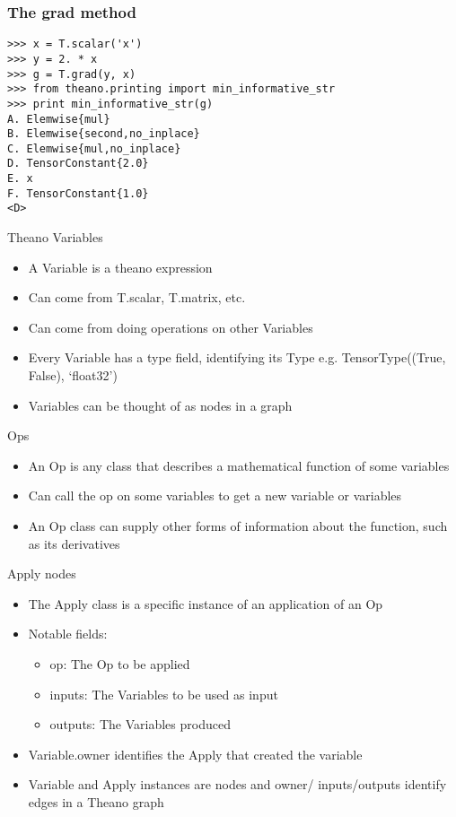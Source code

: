 \documentclass[utf8x,xcolor=pdftex,dvipsnames,table]{beamer}
\begin{document}
\begin{frame}[fragile]
  \frametitle{The grad method}

\begin{lstlisting}
>>> x = T.scalar('x')
>>> y = 2. * x
>>> g = T.grad(y, x)
>>> from theano.printing import min_informative_str
>>> print min_informative_str(g)
A. Elemwise{mul}
B. Elemwise{second,no_inplace}
C. Elemwise{mul,no_inplace}
D. TensorConstant{2.0}
E. x
F. TensorConstant{1.0}
<D>
\end{lstlisting}
\end{frame}

\begin{frame}{Theano Variables}
  \begin{itemize}
  \item A Variable is a theano expression
  \item Can come from T.scalar, T.matrix, etc.
  \item Can come from doing operations on other Variables
  \item Every Variable has a type field, identifying its Type \newline
    e.g. TensorType((True, False), ‘float32’)
  \item Variables can be thought of as nodes in a graph
  \end{itemize}
\end{frame}

\begin{frame}{Ops}
  
  \begin{itemize}
  \item  An Op is any class that describes a
mathematical function of some variables
  \item Can call the op on some variables to get a
new variable or variables
  \item An Op class can supply other forms of
information about the function, such as its
derivatives
  \end{itemize}
\end{frame}

\begin{frame}{Apply nodes}
  \begin{itemize}
  \item The Apply class is a specific instance of an application of an Op
  \item Notable fields:
    \begin{itemize}
    \item op: The Op to be applied
    \item inputs: The Variables to be used as input
    \item outputs: The Variables produced
    \end{itemize}
  \item Variable.owner identifies the Apply that created the variable
  \item Variable and Apply instances are nodes and owner/
    inputs/outputs identify edges in a Theano graph
  \end{itemize}
\end{frame}
\end{document}
